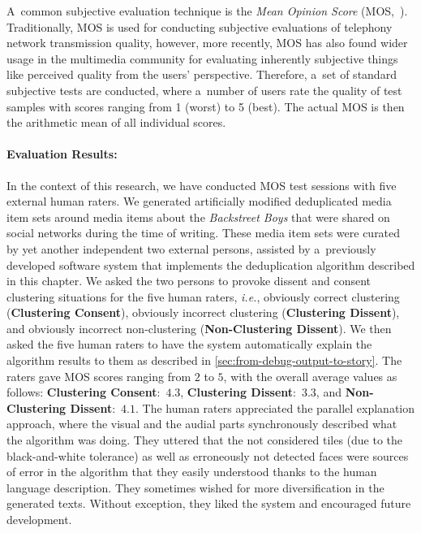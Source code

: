 A~common subjective evaluation technique
is the \emph{Mean Opinion Score} (MOS,~\cite{itu1998mos}).
Traditionally, MOS is used for conducting subjective evaluations
of telephony network transmission quality,
however, more recently, MOS has also found
wider usage in the multimedia community
for evaluating inherently subjective things
like perceived quality from the users' perspective. 
Therefore, a~set of standard subjective tests are conducted,
where a~number of users rate the quality of test samples
with scores ranging from 1 (worst) to 5 (best).
The actual MOS is then the arithmetic mean of all individual scores.

\paragraph{Evaluation Results:}

In the context of this research,
we have conducted MOS test sessions
with five external human raters.
We generated artificially modified deduplicated media item sets
around media items about the \emph{Backstreet Boys}
that were shared on social networks during the time of writing.
These media item sets were curated by yet another independent two external persons,
assisted by a~previously developed software system
that implements the deduplication algorithm described in this chapter.
We asked the two persons to provoke dissent and consent clustering situations
for the five human raters, \emph{i.e.}, obviously correct clustering
(\textbf{Clustering Consent}), obviously incorrect clustering
(\textbf{Clustering Dissent}), and obviously incorrect non-clustering
(\textbf{Non-Clustering Dissent}).
We then asked the five human raters to have the system
automatically explain the algorithm results to them
as described in \autoref{sec:from-debug-output-to-story}.
The raters gave MOS scores ranging from $2$ to $5$,
with the overall average values as follows:
\textbf{Clustering Consent}:~$4.3$, \textbf{Clustering Dissent}:~$3.3$,
and \textbf{Non-Clustering Dissent}:~$4.1$.
The human raters appreciated the parallel explanation approach,
where the visual and the audial parts synchronously described
what the algorithm was doing.
They uttered that the not considered tiles (due to the black-and-white tolerance)
as well as erroneously not detected faces were sources of error
in the algorithm that they easily understood
thanks to the human language description.
They sometimes wished for more diversification in the generated texts.
Without exception, they liked the system and encouraged future development.

